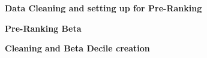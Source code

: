 \textbf{Data Cleaning and setting up for Pre-Ranking}

\textbf{Pre-Ranking Beta}

\textbf{Cleaning and Beta Decile creation}

